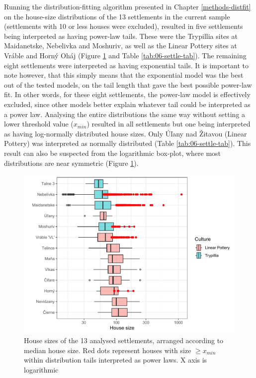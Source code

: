 \documentclass[
  12pt,
]{book}
\begin{document}
Running the distribution-fitting algorithm presented in Chapter \ref{methods-distfit} on the house-size distributions of the 13 settlements in the current sample (settlements with 10 or less houses were excluded), resulted in five settlements being interpreted as having power-law tails. These were the Trypillia sites at Maidanetske, Nebelivka and Moshuriv, as well as the Linear Pottery sites at Vráble and Horný Oháj (Figure \ref{fig:06-settle-box} and Table \ref{tab:06-settle-tab}). The remaining eight settlements were interpreted as having exponential tails. It is important to note however, that this simply means that the exponential model was the best out of the tested models, on the tail length that gave the best possible power-law fit. In other words, for these eight settlements, the power-law model is effectively excluded, since other models better explain whatever tail could be interpreted as a power law. Analysing the entire distributions the same way without setting a lower threshold value (\(x_{min}\)) resulted in all settlements but one being interpreted as having log-normally distributed house sizes. Only Úľany nad Žitavou (Linear Pottery) was interpreted as normally distributed (Table \ref{tab:06-settle-tab}). This result can also be suspected from the logarithmic box-plot, where most distributions are near symmetric (Figure \ref{fig:06-settle-box}).



\begin{figure}

{\centering \includegraphics[width=0.9\linewidth]{bookdown-demo_files/figure-latex/06-settle-box-1} 

}

\caption{House sizes of the 13 analysed settlements, arranged according to median house size. Red dots represent houses with size \(\geq x_{min}\) within distribution tails interpreted as power laws. X axis is logarithmic}\label{fig:06-settle-box}
\end{figure}
\end{document}
